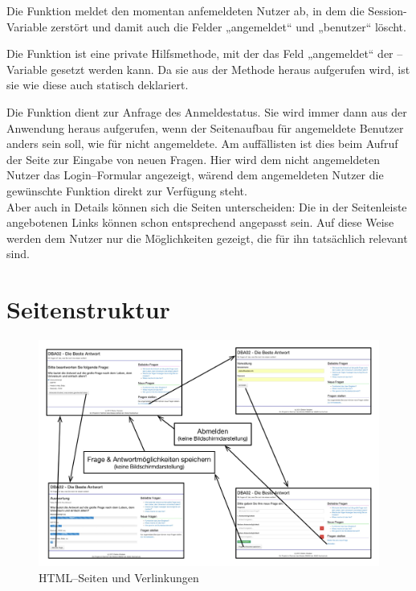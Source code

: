 Die Funktion  meldet den momentan anfemeldeten Nutzer ab, in dem die Session-Variable zerstört und damit auch die Felder „angemeldet“ und „benutzer“ löscht.

Die Funktion  ist eine private Hilfsmethode, mit der das Feld „angemeldet“ der --Variable gesetzt werden kann. Da sie aus der Methode  heraus aufgerufen wird, ist sie wie diese auch statisch deklariert.

Die Funktion  dient zur Anfrage des Anmeldestatus. Sie wird immer dann aus der Anwendung heraus aufgerufen, wenn der Seitenaufbau für angemeldete Benutzer anders sein soll, wie für nicht angemeldete. Am auffällisten ist dies beim Aufruf der Seite zur Eingabe von neuen Fragen. Hier wird dem nicht angemeldeten Nutzer das Login--Formular angezeigt, wärend dem angemeldeten Nutzer die gewünschte Funktion direkt zur Verfügung steht.\\
Aber auch in Details können sich die Seiten unterscheiden: Die in der Seitenleiste angebotenen Links können schon entsprechend angepasst sein. Auf diese Weise werden dem Nutzer nur die Möglichkeiten gezeigt, die für ihn tatsächlich relevant sind. 

\section{Seitenstruktur}

\begin{figure}[H]
\begin{center}
\includegraphics[width=\textwidth]{zustaende.jpg}
\caption{HTML--Seiten und Verlinkungen}
\end{center}
\label{fig:zustaende}
\end{figure}

